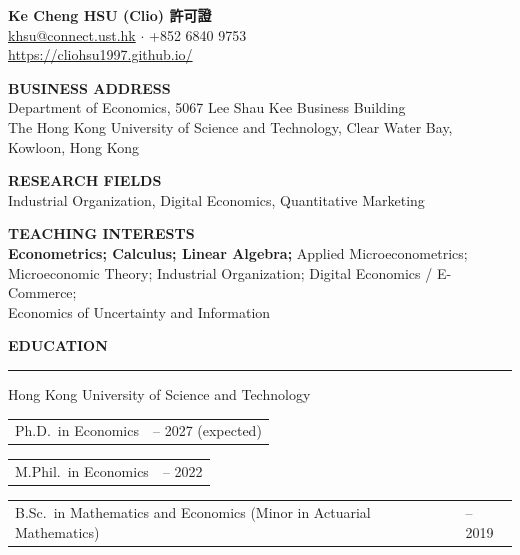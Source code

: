 \documentclass[11pt,letterpaper]{article}
\makeatletter
\newlength{\cvdatecol}
\newcommand{\sectionheader}[1]{%
  \vspace{0.5em}
  {\large\bfseries #1}\\[-0.15em]
  \rule{\textwidth}{0.4pt}\par
  \vspace{0.22em}
}
\newcommand{\cvline}[3][0em]{%
  \par\nobreak
  \noindent\hspace*{#1}%
  \begin{tabularx}{\dimexpr\textwidth-#1\relax}{@{}X@{\hspace{0.75em}}>{\raggedleft\arraybackslash}p{\cvdatecol}@{}}
  #2 & #3 \\
  \end{tabularx}%
}
\makeatother
\begin{document}
\begin{center}
{\LARGE\bfseries Ke Cheng HSU (Clio) 許可證}\\[0.5em]
\href{mailto:khsu@connect.ust.hk}{khsu@connect.ust.hk} $\cdot$ +852 6840 9753\\[0.15em]
\href{https://cliohsu1997.github.io}{https://cliohsu1997.github.io/}
\end{center}

\vspace{0.55em}

\textbf{BUSINESS ADDRESS}\\[0.15em]
\hspace{1.5em} Department of Economics, 5067 Lee Shau Kee Business Building\\
\hspace{1.5em} The Hong Kong University of Science and Technology, Clear Water Bay, Kowloon, Hong Kong

\vspace{0.4em}

\textbf{RESEARCH FIELDS}\\[0.15em]
\hspace{1.5em} Industrial Organization, Digital Economics, Quantitative Marketing

\vspace{0.15em}

\textbf{TEACHING INTERESTS}\\[0.15em]
\hspace{1.5em} \textbf{Econometrics; Calculus; Linear Algebra;} Applied Microeconometrics;\\
\hspace{1.5em} Microeconomic Theory; Industrial Organization; Digital Economics / E-Commerce;\\
\hspace{1.5em} Economics of Uncertainty and Information

\sectionheader{EDUCATION}
{
Hong Kong University of Science and Technology\\[-0.35em]
\cvline[1.5em]{Ph.D.\ in Economics}{2022 -- 2027 (expected)}
\vspace{-0.15em}
\cvline[1.5em]{M.Phil.\ in Economics}{2020 -- 2022}
\vspace{-0.15em}
\cvline[1.5em]{B.Sc.\ in Mathematics and Economics (Minor in Actuarial Mathematics)}{2015 -- 2019}
}
\end{document}
